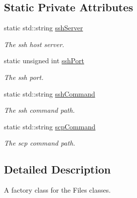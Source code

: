 \subsection*{Static Private Attributes}
\begin{DoxyCompactItemize}
\item 
\hypertarget{classFileFactory_a61ce1e766e2bb232e87409a245519d92}{
static std::string \hyperlink{classFileFactory_a61ce1e766e2bb232e87409a245519d92}{sshServer}}
\label{classFileFactory_a61ce1e766e2bb232e87409a245519d92}

\begin{DoxyCompactList}\small\item\em The ssh host server. \item\end{DoxyCompactList}\item 
\hypertarget{classFileFactory_a6922ca90dccd07b6532f4e5b41a5af62}{
static unsigned int \hyperlink{classFileFactory_a6922ca90dccd07b6532f4e5b41a5af62}{sshPort}}
\label{classFileFactory_a6922ca90dccd07b6532f4e5b41a5af62}

\begin{DoxyCompactList}\small\item\em The ssh port. \item\end{DoxyCompactList}\item 
\hypertarget{classFileFactory_ab422f5811ac3c7ebc908fef58a2fbfe3}{
static std::string \hyperlink{classFileFactory_ab422f5811ac3c7ebc908fef58a2fbfe3}{sshCommand}}
\label{classFileFactory_ab422f5811ac3c7ebc908fef58a2fbfe3}

\begin{DoxyCompactList}\small\item\em The ssh command path. \item\end{DoxyCompactList}\item 
\hypertarget{classFileFactory_a7784b65fe8efa6fbb1370516fefbdc7a}{
static std::string \hyperlink{classFileFactory_a7784b65fe8efa6fbb1370516fefbdc7a}{scpCommand}}
\label{classFileFactory_a7784b65fe8efa6fbb1370516fefbdc7a}

\begin{DoxyCompactList}\small\item\em The scp command path. \item\end{DoxyCompactList}\end{DoxyCompactItemize}


\subsection{Detailed Description}
A factory class for the Files classes. 

